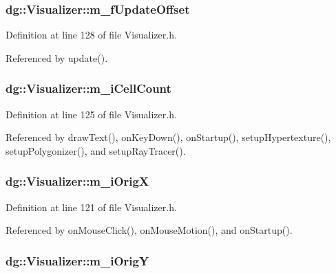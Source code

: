 \subsubsection{ dg::Visualizer::m\_\-f\-Update\-Offset\hspace{0.3cm}{\tt  [protected]}}\label{classdg_1_1Visualizer_n26}




Definition at line 128 of file Visualizer.h.

Referenced by update().
\subsubsection{ dg::Visualizer::m\_\-i\-Cell\-Count\hspace{0.3cm}{\tt  [protected]}}\label{classdg_1_1Visualizer_n23}




Definition at line 125 of file Visualizer.h.

Referenced by draw\-Text(), on\-Key\-Down(), on\-Startup(), setup\-Hypertexture(), setup\-Polygonizer(), and setup\-Ray\-Tracer().
\subsubsection{ dg::Visualizer::m\_\-i\-Orig\-X\hspace{0.3cm}{\tt  [protected]}}\label{classdg_1_1Visualizer_n21}




Definition at line 121 of file Visualizer.h.

Referenced by on\-Mouse\-Click(), on\-Mouse\-Motion(), and on\-Startup().
\subsubsection{ dg::Visualizer::m\_\-i\-Orig\-Y\hspace{0.3cm}{\tt  [protected]}}\label{classdg_1_1Visualizer_n22}





